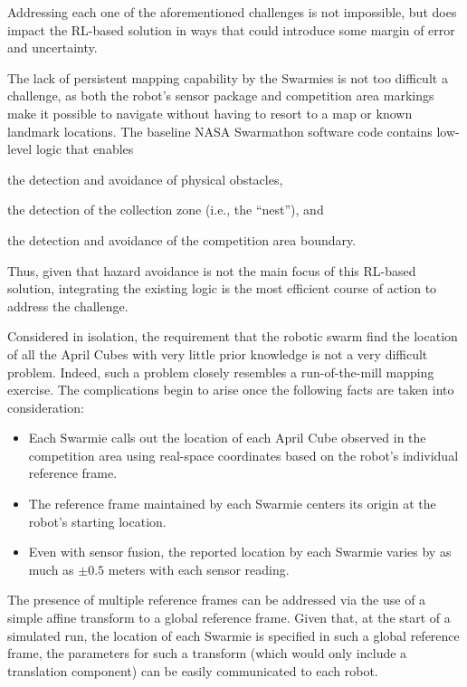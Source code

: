 \documentclass[sigconf,authordraft]{acmart}
\begin{document}
Addressing each one of the aforementioned challenges is not impossible, but does impact the RL-based solution in ways that could introduce some margin of error and uncertainty.

The lack of persistent mapping capability by the Swarmies is not too difficult a challenge, as both the robot's sensor package and competition area markings make it possible to navigate without having to resort to a map or known landmark locations. The baseline NASA Swarmathon software code contains low-level logic that enables
\begin{enumerate*}[label={(\arabic*)}]
  \item the detection and avoidance of physical obstacles,
  \item the detection of the collection zone (i.e., the ``nest''), and
  \item the detection and avoidance of the competition area boundary.
\end{enumerate*}
Thus, given that hazard avoidance is not the main focus of this RL-based solution, integrating the existing logic is the most efficient course of action to address the challenge.

Considered in isolation, the requirement that the robotic swarm find the location of all the April Cubes with very little prior knowledge is not a very difficult problem. Indeed, such a problem closely resembles a run-of-the-mill mapping exercise. The complications begin to arise once the following facts are taken into consideration:

\begin{itemize}
  \item Each Swarmie calls out the location of each April Cube observed in the competition area using real-space coordinates based on the robot's individual reference frame.
  \item The reference frame maintained by each Swarmie centers its origin at the robot's starting location.
  \item Even with sensor fusion, the reported location by each Swarmie varies by as much as $\pm 0.5$ meters with each sensor reading.
\end{itemize}

The presence of multiple reference frames can be addressed via the use of a simple affine transform to a global reference frame. Given that, at the start of a simulated run, the location of each Swarmie is specified in such a global reference frame, the parameters for such a transform (which would only include a translation component) can be easily communicated to each robot.
\end{document}
